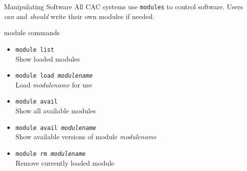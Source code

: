 \documentclass[handout]{beamer}
\begin{document}
\begin{frame}{Manipulating Software}
  All CAC systems use \texttt{modules} to control software. Users \textit{can} and \textit{should} write their own modules if needed.
  \begin{block}{module commands}
  \begin{itemize}
    \item \texttt{module list} \\ Show loaded modules
    \item \texttt{module load \textit{modulename}} \\  Load \textit{modulename} for use
    \item \texttt{module avail} \\ Show all available modules
    \item \texttt{module avail \textit{modulename}} \\ Show available versions of module \textit{modulename}
    \item \texttt{module rm \textit{modulename}} \\  Remove currently loaded module
  \end{itemize}
  \end{block}
\end{frame}
\end{document}
